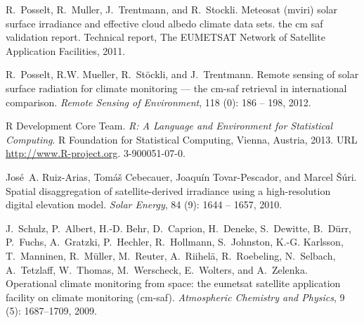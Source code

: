 \documentclass[11pt, english]{article}
\begin{document}
\begin{thebibliography}{20}
R.~Posselt, R.~Muller, J.~Trentmann, and R.~Stockli.
\newblock Meteosat (mviri) solar surface irradiance and effective cloud albedo
  climate data sets. the cm saf validation report.
\newblock Technical report, The EUMETSAT Network of Satellite Application
  Facilities, 2011.

R.~Posselt, R.W. Mueller, R.~Stöckli, and J.~Trentmann.
\newblock Remote sensing of solar surface radiation for climate monitoring —
  the cm-saf retrieval in international comparison.
\newblock \emph{Remote Sensing of Environment}, 118 (0): 186
  -- 198, 2012.

{R Development Core Team}.
\newblock \emph{R: A Language and Environment for Statistical Computing}.
\newblock R Foundation for Statistical Computing, Vienna, Austria, 2013.
\newblock URL \url{http://www.R-project.org}.
 3-900051-07-0.

José~A. Ruiz-Arias, Tomáš Cebecauer, Joaquín Tovar-Pescador, and Marcel
  Šúri.
\newblock Spatial disaggregation of satellite-derived irradiance using a
  high-resolution digital elevation model.
\newblock \emph{Solar Energy}, 84 (9): 1644 -- 1657, 2010.

J.~Schulz, P.~Albert, H.-D. Behr, D.~Caprion, H.~Deneke, S.~Dewitte, B.~D\"urr,
  P.~Fuchs, A.~Gratzki, P.~Hechler, R.~Hollmann, S.~Johnston, K.-G. Karlsson,
  T.~Manninen, R.~M\"uller, M.~Reuter, A.~Riihel\"a, R.~Roebeling, N.~Selbach,
  A.~Tetzlaff, W.~Thomas, M.~Werscheck, E.~Wolters, and A.~Zelenka.
\newblock Operational climate monitoring from space: the eumetsat satellite
  application facility on climate monitoring (cm-saf).
\newblock \emph{Atmospheric Chemistry and Physics}, 9 (5):
  1687--1709, 2009.

\end{thebibliography}
%
\end{document}
